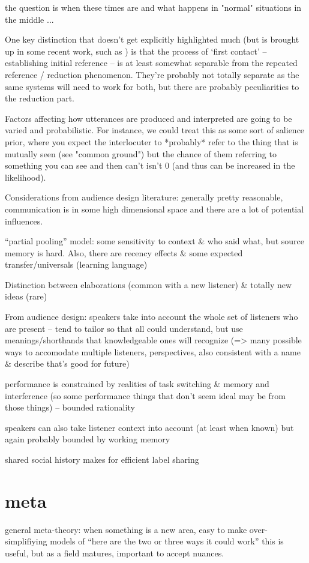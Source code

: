 \documentclass[]{article}
\begin{document}
the question is when these times are and what happens in "normal" situations in the middle ... 


One key distinction that doesn't get explicitly highlighted much (but is brought up in some recent work, such as \cite{leung2023}) is that the process of `first contact' -- establishing initial reference -- is at least somewhat separable from the repeated reference / reduction phenomenon. They're probably not totally separate as the same systems will need to work for both, but there are probably peculiarities to the reduction part. 

Factors affecting how utterances are produced and interpreted are going to be varied and probabilistic. For instance, we could treat this as some sort of salience prior, where you expect the interlocuter to *probably* refer to the thing that is mutually seen (see "common ground") but the chance of them referring to something you can see and then can't isn't 0 (and thus can be increased in the likelihood). 

Considerations from audience design literature: generally pretty reasonable, communication is in some high dimensional space and there are a lot of potential influences. 

``partial pooling'' model: some sensitivity to context \& who said what, but source memory is hard. Also, there are recency effects \& some expected transfer/universals (learning language) 

Distinction between elaborations (common with a new listener) \& totally new ideas (rare)

From audience design: speakers take into account the whole set of listeners who are present -- tend to tailor so that all could understand, but use meanings/shorthands that knowledgeable ones will recognize (=> many possible ways to accomodate multiple listeners, perspectives, also consistent with a name \& describe that's good for future) 

performance is constrained by realities of task switching \& memory and interference (so some performance things that don't seem ideal may be from those things) -- bounded rationality 

speakers can also take listener context into account (at least when known) but again probably bounded by working memory

shared social history makes for efficient label sharing 


\section{meta}
general meta-theory: when something is a new area, easy to make over-simplifiying models of “here are the two or three ways it could work” this is useful, but as a field matures, important to accept nuances.
\end{document}
